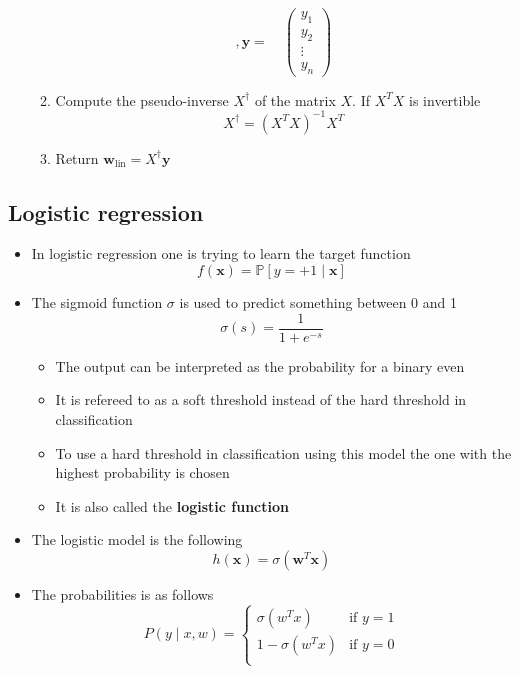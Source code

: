 \documentclass[a4, english]{article}
\begin{document}
\begin{itemize}
\begin{enumerate}
\begin{equation*}
  , \pmb y = \quad
  \begin{pmatrix} 
  y_1 \\ y_2 \\ \vdots \\ y_n
   \end{pmatrix}
\end{equation*}
    \item Compute the pseudo-inverse $X^\dagger$ of the matrix $X$. If $X^TX$ is invertible
\begin{equation*}
  X^\dagger = (X^TX)^{-1}X^T
\end{equation*}
    \item Return $\pmb w_{\text{lin}} = X^\dagger \pmb y$ 
  \end{enumerate}

\end{itemize}


\subsection{Logistic regression}
\begin{itemize}
	\item In logistic regression one is trying to learn the target function
\begin{equation*}
  f(\pmb x) = \mathbb P[y = +1 \mid \pmb x]
\end{equation*}
  \item The sigmoid function $\sigma$ is used to predict something between 0 and 1 
\begin{equation*}
    \sigma(s) = \frac{1}{1+e^{-s}}
\end{equation*}
  \begin{itemize}
  	\item The output can be interpreted as the probability for a binary even
    \item It is refereed to as a soft threshold instead of the hard threshold in classification
    \item To use a hard threshold in classification using this model the one with the highest probability is chosen 
    \item It is also called the \textbf{logistic function}
  \end{itemize} 
  \item The logistic model is the following 
\begin{equation*}
  h(\pmb x) = \sigma (\pmb w^T \pmb x )
\end{equation*}
  \item The probabilities is as follows
\begin{equation*}
	P(y \mid x,w) = 
		\begin{cases}
			\mbox{$\sigma(w^Tx)$} & \mbox{if $y=1$} \\
			\mbox{$1-\sigma(w^Tx)$} & \mbox{if $y=0$} \\
		\end{cases}
\end{equation*}

\end{itemize}
\end{document}

